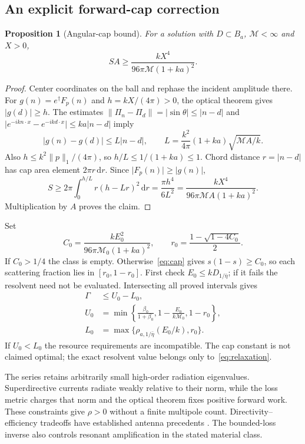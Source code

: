 \documentclass[11pt]{article}
\newtheorem{proposition}[theorem]{Proposition}
\newcommand{\dd}{\,\mathrm{d}}
\newcommand{\norm}[1]{\lVert #1\rVert}
\newcommand{\abs}[1]{\lvert #1\rvert}
\begin{document}
\subsection{An explicit forward-cap correction}
\begin{proposition}[Angular-cap bound]\label{prop:cap}
For a solution with $D\subset B_a$, $\mathcal M<\infty$ and $X>0$,
\begin{equation}\label{eq:cap}
 SA\geq\frac{kX^4}{96\pi\mathcal M(1+ka)^2}.
\end{equation}
\end{proposition}
\begin{proof}
Center coordinates on the ball and rephase the incident amplitude there. For $g(n)=e^\dagger F_p(n)$ and $h=kX/(4\pi)>0$, the optical theorem gives $\abs{g(d)}\geq h$. The estimates $\norm{\Pi_n-\Pi_d}=\abs{\sin\theta}\leq\abs{n-d}$ and $\abs{e^{-ikn\cdot x}-e^{-ikd\cdot x}}\leq ka\abs{n-d}$ imply
\[
 \abs{g(n)-g(d)}\leq L\abs{n-d},\qquad
 L=\frac{k^2}{4\pi}(1+ka)\sqrt{\mathcal M A/k}.
\]
Also $h\leq k^2\norm p_1/(4\pi)$, so $h/L\leq1/(1+ka)\leq1$. Chord distance $r=\abs{n-d}$ has cap area element $2\pi r\dd r$. Since $\abs{F_p(n)}\geq\abs{g(n)}$,
\[
 S\geq2\pi\int_0^{h/L}r(h-Lr)^2\dd r
 =\frac{\pi h^4}{6L^2}
 =\frac{kX^4}{96\pi\mathcal M A(1+ka)^2}.
\]
Multiplication by $A$ proves the claim.
\end{proof}

Set
\begin{equation}\label{eq:cap-resources}
 C_0=\frac{kE_0^2}{96\pi\mathcal M_0(1+ka)^2},\qquad
 r_0=\frac{1-\sqrt{1-4C_0}}{2}.
\end{equation}
If $C_0>1/4$ the class is empty. Otherwise~\eqref{eq:cap} gives $s(1-s)\geq C_0$, so each scattering fraction lies in $[r_0,1-r_0]$. First check $E_0\leq kD_{1/\bar\eta}$; if it fails the resolvent need not be evaluated. Intersecting all proved intervals gives
\begin{align}
 \Gamma&\leq U_0-L_0,\label{eq:combined}\\
 U_0&=\min\left\{\frac{\beta_0}{1+\beta_0},
                  1-\frac{E_0}{k\mathcal M_0},1-r_0\right\},\nonumber\\
 L_0&=\max\{\rho_{a,1/\bar\eta}(E_0/k),r_0\}.\nonumber
\end{align}
If $U_0<L_0$ the resource requirements are incompatible. The cap constant is not claimed optimal; the exact resolvent value belongs only to~\eqref{eq:relaxation}.

The series retains arbitrarily small high-order radiation eigenvalues. Superdirective currents radiate weakly relative to their norm, while the loss metric charges that norm and the optical theorem fixes positive forward work. These constraints give $\rho>0$ without a finite multipole count. Directivity--efficiency tradeoffs have established antenna precedents \citep{GustafssonCapek2019}. The bounded-loss inverse also controls resonant amplification in the stated material class.
\end{document}
